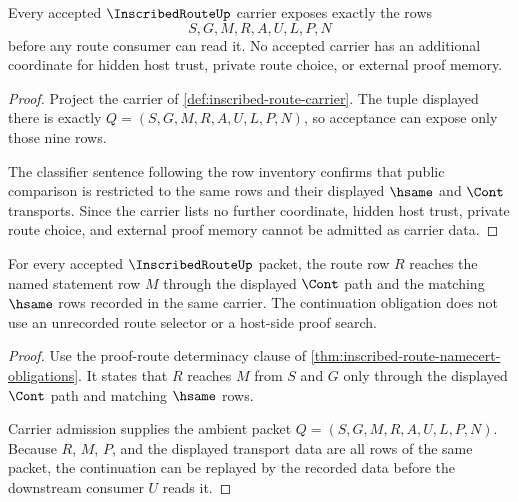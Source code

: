 \begin{theorem}
\label{thm:inscribed-route-carrier-admission}
Every accepted $\InscribedRouteUp$ carrier exposes exactly the rows
$$
S,G,M,R,A,U,L,P,N
$$
before any route consumer can read it. No accepted carrier has an additional coordinate for hidden host trust, private route choice, or external proof memory.
\end{theorem}
\begin{proof}
Project the carrier of \autoref{def:inscribed-route-carrier}. The tuple displayed there is exactly $Q=(S,G,M,R,A,U,L,P,N)$, so acceptance can expose only those nine rows.

The classifier sentence following the row inventory confirms that public comparison is restricted to the same rows and their displayed $\hsame$ and $\Cont$ transports. Since the carrier lists no further coordinate, hidden host trust, private route choice, and external proof memory cannot be admitted as carrier data.
\end{proof}

\begin{theorem}
\label{thm:inscribed-route-continuation-obligation}
For every accepted $\InscribedRouteUp$ packet, the route row $R$ reaches the named statement row $M$ through the displayed $\Cont$ path and the matching $\hsame$ rows recorded in the same carrier. The continuation obligation does not use an unrecorded route selector or a host-side proof search.
\end{theorem}
\begin{proof}
Use the proof-route determinacy clause of \autoref{thm:inscribed-route-namecert-obligations}. It states that $R$ reaches $M$ from $S$ and $G$ only through the displayed $\Cont$ path and matching $\hsame$ rows.

Carrier admission supplies the ambient packet $Q=(S,G,M,R,A,U,L,P,N)$. Because $R$, $M$, $P$, and the displayed transport data are all rows of the same packet, the continuation can be replayed by the recorded data before the downstream consumer $U$ reads it.
\end{proof}

